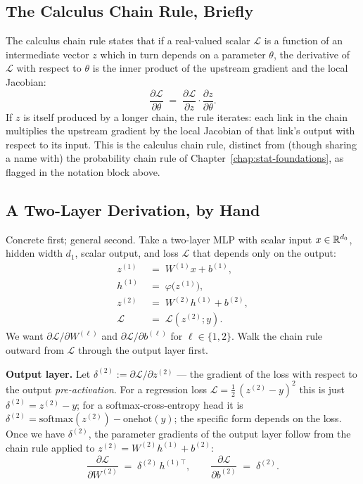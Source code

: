 \subsection{The Calculus Chain Rule, Briefly}

The calculus chain rule states that if a real-valued scalar
$\mathcal{L}$ is a function of an intermediate vector $z$ which
in turn depends on a parameter $\theta$, the derivative of
$\mathcal{L}$ with respect to $\theta$ is the inner product of the
upstream gradient and the local Jacobian:
\begin{equation}
  \frac{\partial \mathcal{L}}{\partial \theta}
  \;=\;
  \frac{\partial \mathcal{L}}{\partial z}
  \cdot
  \frac{\partial z}{\partial \theta}.
  \label{eq:nn-chain-rule}
\end{equation}
If $z$ is itself produced by a longer chain, the rule iterates:
each link in the chain multiplies the upstream gradient by the
local Jacobian of that link's output with respect to its input.
This is the calculus chain rule, distinct from (though sharing a
name with) the probability chain rule of Chapter~\ref{chap:stat-foundations}, as flagged in
the notation block above.

\subsection{A Two-Layer Derivation, by Hand}

Concrete first; general second. Take a two-layer MLP with scalar
input $x \in \mathbb{R}^{d_0}$, hidden width $d_1$, scalar output, and
loss $\mathcal{L}$ that depends only on the output:
\begin{align*}
  z^{(1)} &\;=\; W^{(1)} x + b^{(1)}, \\
  h^{(1)} &\;=\; \varphi\!\bigl(z^{(1)}\bigr), \\
  z^{(2)} &\;=\; W^{(2)} h^{(1)} + b^{(2)}, \\
  \mathcal{L} &\;=\; \mathcal{L}(z^{(2)}; y).
\end{align*}
We want $\partial \mathcal{L} / \partial W^{(\ell)}$ and
$\partial \mathcal{L} / \partial b^{(\ell)}$ for $\ell \in
\{1, 2\}$. Walk the chain rule outward from $\mathcal{L}$ through
the output layer first.

\textbf{Output layer.} Let
$\delta^{(2)} := \partial \mathcal{L} / \partial z^{(2)}$ ---
the gradient of the loss with respect to the output
\emph{pre-activation}. For a regression loss
$\mathcal{L} = \tfrac{1}{2}\,(z^{(2)} - y)^2$ this is just
$\delta^{(2)} = z^{(2)} - y$; for a softmax-cross-entropy head it
is $\delta^{(2)} = \mathrm{softmax}(z^{(2)}) - \mathrm{onehot}(y)$;
the specific form depends on the loss. Once we have $\delta^{(2)}$,
the parameter gradients of the output layer follow from the chain
rule applied to $z^{(2)} = W^{(2)} h^{(1)} + b^{(2)}$:
\[
  \frac{\partial \mathcal{L}}{\partial W^{(2)}}
  \;=\; \delta^{(2)} \, h^{(1)\top},
  \qquad
  \frac{\partial \mathcal{L}}{\partial b^{(2)}}
  \;=\; \delta^{(2)}.
\]

